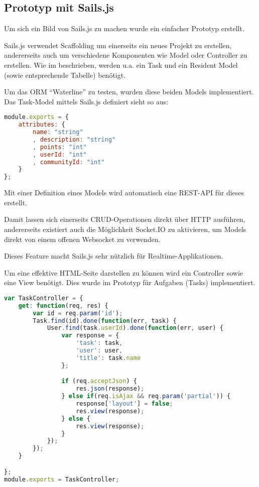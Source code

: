 \subsection{Prototyp mit Sails.js}
Um sich ein Bild von Sails.js zu machen wurde ein einfacher Prototyp \cite{SailsPrototyp} erstellt.

Sails.js verwendet \gls{Scaffolding} um einerseits ein neues Projekt zu erstellen, andererseits auch um verschiedene Komponenten wie Model oder Controller zu erstellen. Wie im  beschrieben, werden u.a. ein Task und ein Resident Model (sowie entsprechende Tabelle) benötigt.

Um das \gls{ORM} ``Waterline'' \cite{Waterline} zu testen, wurden diese beiden Models implementiert. Das Task-Model mittels Sails.js definiert sieht so aus:

\begin{lstlisting}[language=JavaScript, caption=Task Model in Sails.js (Name wird durch Dateiname definiert.)]
module.exports = {
	attributes: {
		name: "string"
		, description: "string"
		, points: "int"
		, userId: "int"
		, communityId: "int"
	}
};
\end{lstlisting}

Mit einer Definition eines Models wird automatisch eine \gls{REST}-API für dieses erstellt.

Damit lassen sich einerseits CRUD-Operationen direkt über HTTP ausführen, andererseits existiert auch die Möglichkeit Socket.IO \cite{SocketIO} zu aktivieren, um Models direkt von einem offenen \gls{Websocket} zu verwenden.

Dieses Feature macht Sails.js sehr nützlich für \gls{Realtime}-Applikationen.

Um eine effektive HTML-Seite darstellen zu können wird ein Controller sowie eine View benötigt. Dies wurde im Prototyp für Aufgaben (Tasks) implementiert.

\begin{lstlisting}[language=JavaScript, caption=Task Controller in Sails.js, label=lst:sailsjstaskcontroller]
var TaskController = {
	get: function(req, res) {
		var id = req.param('id');
		Task.find(id).done(function(err, task) {
			User.find(task.userId).done(function(err, user) {
				var response = {
					'task': task,
					'user': user,
					'title': task.name
				};

				if (req.acceptJson) {
					res.json(response);
				} else if(req.isAjax && req.param('partial')) {
					response['layout'] = false;
					res.view(response);
				} else {
					res.view(response);
				}
			});
		});
	}

};
module.exports = TaskController;
\end{lstlisting}

